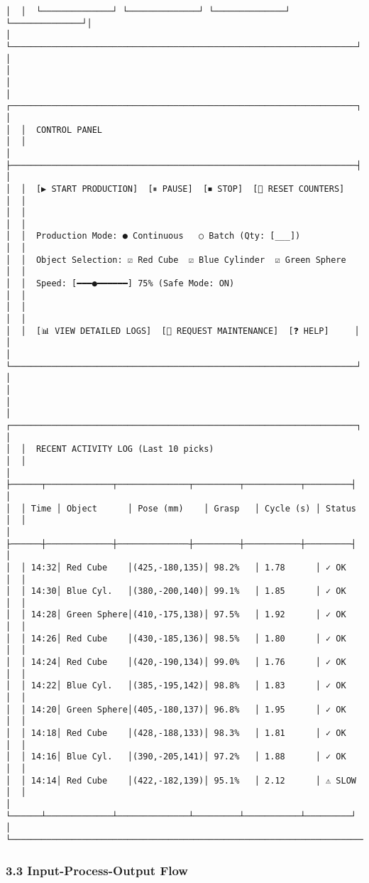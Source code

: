 \documentclass[
]{article}
\begin{document}
\begin{verbatim}
│  │  └──────────────┘ └──────────────┘ └──────────────┘ └──────────────┘│
│  └────────────────────────────────────────────────────────────────────┘  │
│                                                                            │
│  ┌────────────────────────────────────────────────────────────────────┐  │
│  │  CONTROL PANEL                                                     │  │
│  ├────────────────────────────────────────────────────────────────────┤  │
│  │  [▶ START PRODUCTION]  [⏸ PAUSE]  [⏹ STOP]  [🔄 RESET COUNTERS]   │  │
│  │                                                                    │  │
│  │  Production Mode: ● Continuous   ○ Batch (Qty: [___])             │  │
│  │  Object Selection: ☑ Red Cube  ☑ Blue Cylinder  ☑ Green Sphere   │  │
│  │  Speed: [━━━●━━━━━━] 75% (Safe Mode: ON)                          │  │
│  │                                                                    │  │
│  │  [📊 VIEW DETAILED LOGS]  [🔧 REQUEST MAINTENANCE]  [❓ HELP]     │  │
│  └────────────────────────────────────────────────────────────────────┘  │
│                                                                            │
│  ┌────────────────────────────────────────────────────────────────────┐  │
│  │  RECENT ACTIVITY LOG (Last 10 picks)                              │  │
│  ├──────┬─────────────┬──────────────┬─────────┬───────────┬─────────┤  │
│  │ Time │ Object      │ Pose (mm)    │ Grasp   │ Cycle (s) │ Status  │  │
│  ├──────┼─────────────┼──────────────┼─────────┼───────────┼─────────┤  │
│  │ 14:32│ Red Cube    │(425,-180,135)│ 98.2%   │ 1.78      │ ✓ OK    │  │
│  │ 14:30│ Blue Cyl.   │(380,-200,140)│ 99.1%   │ 1.85      │ ✓ OK    │  │
│  │ 14:28│ Green Sphere│(410,-175,138)│ 97.5%   │ 1.92      │ ✓ OK    │  │
│  │ 14:26│ Red Cube    │(430,-185,136)│ 98.5%   │ 1.80      │ ✓ OK    │  │
│  │ 14:24│ Red Cube    │(420,-190,134)│ 99.0%   │ 1.76      │ ✓ OK    │  │
│  │ 14:22│ Blue Cyl.   │(385,-195,142)│ 98.8%   │ 1.83      │ ✓ OK    │  │
│  │ 14:20│ Green Sphere│(405,-180,137)│ 96.8%   │ 1.95      │ ✓ OK    │  │
│  │ 14:18│ Red Cube    │(428,-188,133)│ 98.3%   │ 1.81      │ ✓ OK    │  │
│  │ 14:16│ Blue Cyl.   │(390,-205,141)│ 97.2%   │ 1.88      │ ✓ OK    │  │
│  │ 14:14│ Red Cube    │(422,-182,139)│ 95.1%   │ 2.12      │ ⚠ SLOW  │  │
│  └──────┴─────────────┴──────────────┴─────────┴───────────┴─────────┘  │
└────────────────────────────────────────────────────────────────────────────────┘
\end{verbatim}

\hypertarget{input-process-output-flow}{%
\subsubsection{3.3 Input-Process-Output
Flow}\label{input-process-output-flow}}
\end{document}
